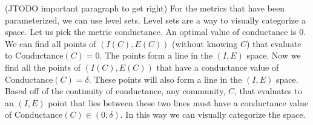 \documentclass[phd,tocprelim]{cornell}
\begin{document}
(JTODO important paragraph to get right)
For the metrics that have been parameterized, we can use level sets.  Level sets are a way to visually categorize a space.  Let us pick the metric conductance.  An optimal value of conductance is $0$.  We can find all points of $(I(C), E(C))$ (without knowing $C$) that evaluate to {\sc Conductance}$(C) = 0$.  The points form a line in the $(I, E)$ space.  Now we find all the points of $(I(C), E(C))$ that have a conductance value of {\sc Conductance}$(C) = \delta$.  These points will also form a line in the $(I, E)$ space.  Based off of the continuity of conductance, any community, $C$, that evaluates to an $(I, E)$ point that lies between these two lines must have a conductance value of {\sc Conductance}$(C) \in (0, \delta)$.  In this way we can visually categorize the space.
\end{document}
